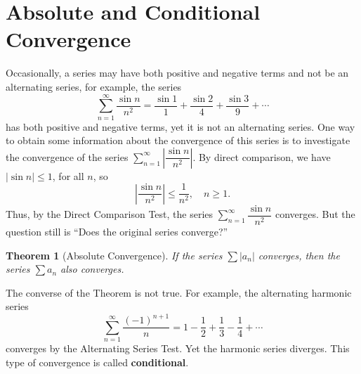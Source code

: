 \documentclass[titlepage,a4paper,12pt]{report}
\newtheorem{theorem}{Theorem}[section]
\begin{document}
\section{Absolute and Conditional Convergence}
Occasionally, a series may have both positive and negative terms and not be an alternating series, for example, the series 
\[\sum _{n=1}^\infty \dfrac{\sin n}{n^2}=\dfrac{\sin 1}{1}+\dfrac{\sin 2}{4}+\dfrac{\sin 3}{9}+\cdots\] has both positive and negative terms, yet it is not an alternating series. One way to obtain some information about the convergence of this series is to investigate the convergence of the series $\displaystyle \sum _{n=1}^\infty \left|\dfrac{\sin n}{n^2}\right|$. By direct comparison, we have $|\sin n|\leq 1$, for all $n$, so 
\[\left|\dfrac{\sin n}{n^2}\right| \leq \dfrac{1}{n^2}, \quad n\geq 1.\]
Thus, by the Direct Comparison Test, the series $\displaystyle \sum _{n=1}^\infty \dfrac{\sin n}{n^2}$ converges. But the question still is ``Does the original series converge?'' 
\begin{theorem}[Absolute Convergence]
If the series $\displaystyle \sum |a_n|$ converges, then the series $\displaystyle \sum a_n$ also converges.
\end{theorem}
\noindent The converse of the Theorem is not true. For example, the alternating harmonic series 
\[ \sum _{n=1}^\infty \dfrac{(-1)^{n+1}}{n}=1-\dfrac{1}{2}+\dfrac{1}{3}-\dfrac{1}{4}+\cdots\] converges by the Alternating Series Test. Yet the harmonic series diverges. This type of convergence is called \textbf{conditional}.
\end{document}
